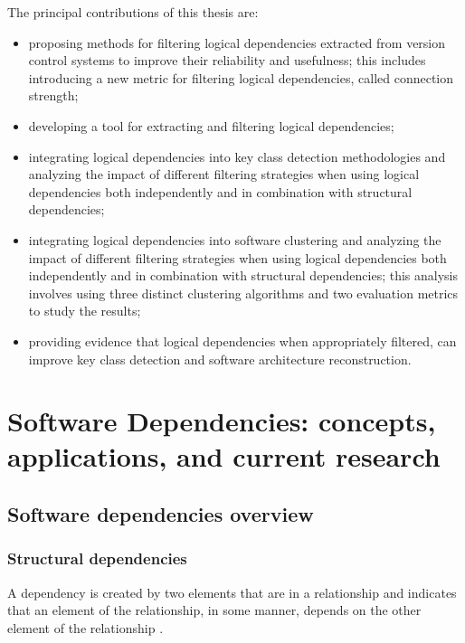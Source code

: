 \hspace{4em}The principal contributions of this thesis are:  
\begin{itemize}  
    \item proposing methods for filtering logical dependencies extracted from version control systems to improve their reliability and usefulness; this includes introducing a new metric for filtering logical dependencies, called connection strength;  
    \item developing a tool for extracting and filtering logical dependencies;  
    \item integrating logical dependencies into key class detection methodologies and analyzing the impact of different filtering strategies when using logical dependencies both independently and in combination with structural dependencies;  
    \item integrating logical dependencies into software clustering and analyzing the impact of different filtering strategies when using logical dependencies both independently and in combination with structural dependencies; this analysis involves using three distinct clustering algorithms and two evaluation metrics to study the results;  
    \item providing evidence that logical dependencies when appropriately filtered, can improve key class detection and software architecture reconstruction.  
\end{itemize}  


\chapter{Software Dependencies: concepts, applications, and current research}
\label{dep}

\section{Software dependencies overview}

\subsection{Structural dependencies}
\hspace{4em} A dependency is created by two elements that are in a relationship and indicates that an element of the relationship, in some manner, depends on the other element of the relationship \cite{Booch:2004:OAD:975416, Cataldo2009SoftwareDW}.


